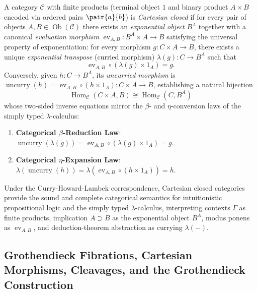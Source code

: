 A category $\mathcal{C}$ with finite products (terminal object $1$ and binary product $A \times B$ encoded via ordered pairs $\pair{a}{b}$) is \emph{Cartesian closed} if for every pair of objects $A, B \in \operatorname{Ob}(\mathcal{C})$ there exists an \emph{exponential object} $B^A$ together with a canonical \emph{evaluation morphism} $\operatorname{ev}_{A,B}\colon B^A \times A \to B$ satisfying the universal property of exponentiation: for every morphism $g\colon C \times A \to B$, there exists a unique \emph{exponential transpose} (curried morphism) $\lambda(g)\colon C \to B^A$ such that
\[
\operatorname{ev}_{A,B} \circ (\lambda(g) \times 1_A) = g.
\]
Conversely, given $h\colon C \to B^A$, its \emph{uncurried morphism} is $\operatorname{uncurry}(h) = \operatorname{ev}_{A,B} \circ (h \times 1_A)\colon C \times A \to B$, establishing a natural bijection
\[
\operatorname{Hom}_{\mathcal{C}}(C \times A, B) \cong \operatorname{Hom}_{\mathcal{C}}(C, B^A)
\]
whose two-sided inverse equations mirror the $\beta$- and $\eta$-conversion laws of the simply typed $\lambda$-calculus:
\begin{enumerate}
  \item \textbf{Categorical $\beta$-Reduction Law}: $\operatorname{uncurry}(\lambda(g)) = \operatorname{ev}_{A,B} \circ (\lambda(g) \times 1_A) = g$.
  \item \textbf{Categorical $\eta$-Expansion Law}: $\lambda(\operatorname{uncurry}(h)) = \lambda(\operatorname{ev}_{A,B} \circ (h \times 1_A)) = h$.
\end{enumerate}
Under the Curry-Howard-Lambek correspondence, Cartesian closed categories provide the sound and complete categorical semantics for intuitionistic propositional logic and the simply typed $\lambda$-calculus, interpreting contexts $\Gamma$ as finite products, implication $A \supset B$ as the exponential object $B^A$, modus ponens as $\operatorname{ev}_{A,B}$, and deduction-theorem abstraction as currying $\lambda(-)$.

\subsection{Grothendieck Fibrations, Cartesian Morphisms, Cleavages, and the Grothendieck Construction}
\label{subsec:grothendieck_fibrations_cleavages_construction}

